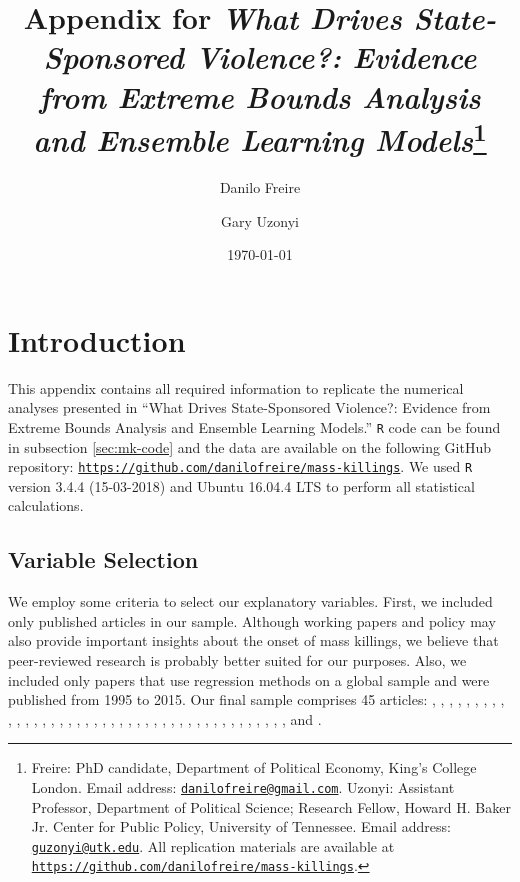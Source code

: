 \documentclass[a4paper,12pt]{article}
\title{Appendix for \textit{What Drives State-Sponsored Violence?: Evidence from Extreme Bounds Analysis and Ensemble Learning Models}\thanks{Freire: PhD candidate, Department of Political Economy, King's College London. Email address: \href{mailto:danilofreire@gmail.com}{\texttt{danilofreire@gmail.com}}. Uzonyi: Assistant Professor, Department of Political Science; Research Fellow, Howard H. Baker Jr. Center for Public Policy, University of Tennessee. Email address: \href{mailto:guzonyi@utk.edu}{\texttt{guzonyi@utk.edu}}. All replication materials are available at \href{https://github.com/danilofreire/mass-killings}{\texttt{https://github.com/danilofreire/mass-killings}}.}}
\author{Danilo Freire \and Gary Uzonyi}
\date{\today}
\begin{document}
\maketitle

{\hypersetup{linkcolor=black}
\tableofcontents
}

\newpage
	
\section{Introduction}
\label{sec:intro}
	
\doublespacing
	
This appendix contains all required information to replicate the numerical analyses presented in ``What Drives State-Sponsored Violence?: Evidence from Extreme Bounds Analysis and Ensemble Learning Models.'' \texttt{R} code can be found in subsection \ref{sec:mk-code} and the data are available on the following GitHub repository: \href{https://github.com/danilofreire/mass-killings}{\texttt{https://github.com/danilofreire/mass-killings}}. We used \texttt{R} version 3.4.4 (15-03-2018) and Ubuntu 16.04.4 LTS to perform all statistical calculations.

\subsection{Variable Selection}
\label{sec:mk-vs}

We employ some criteria to select our explanatory variables. First, we included only published articles in our sample. Although working papers and policy may also provide important insights about the onset of mass killings, we believe that peer-reviewed research is probably better suited for our purposes. Also, we included only papers that use regression methods on a global sample and were published from 1995 to 2015. Our final sample comprises 45 articles: \citet{anderton2015new}, \citet{balcells2010rivalry, balcells2011continuation}, \citet{besanccon2005relative}, \citet{bulutgil2015social}, \citet{bundervoet2009livestock}, \citet{clayton2016civilianizing}, \citet{colaresi2008kill}, \citet{downes2006desperate, downes2007restraint},  \citet{easterly2006development}, \citet{eck2007one}, \citet{esteban2015strategic}, \citet{fazal2015particular}, \citet{fjelde2014weakening}, \citet{goldsmith2013forecasting}, \citet{harff2003no}, \citet{joshi2017kills}, \citet{kim2010makes}, \citet{kim2016revolutionary}, \citet{kisangani2007political}, \citet{koren2017means}, \citet{krain1997state}, \citet{manekin2013violence}, \citet{mcdoom2013killed,mcdoom2014predicting}, \citet{melander2009new}, \citet{montalvo2008discrete}, \citet{pilster2016differentiation}, \citet{querido2009state}, \citet{raleigh2012violence}, \citet{rost2013will}, \citet{rummel1995democracy}, \citet{schneider2013accounting}, \citet{siroky2015empire}, \citet{stanton2015regulating}, \citet{sullivan2012blood}, \citet{tir2008domestic}, \citet{ulfelder2008assessing}, \citet{ulfelder2012forecasting}, \citet{uzonyi2015civil, uzonyi2016domestic} \citet{valentino2004draining}, \citet{valentino2006covenants}, \citet{verpoorten2012leave}, \citet{wayman2010explaining}, \citet{wig2016local}, and \citet{yanagizawa2014propaganda}.
\end{document}
